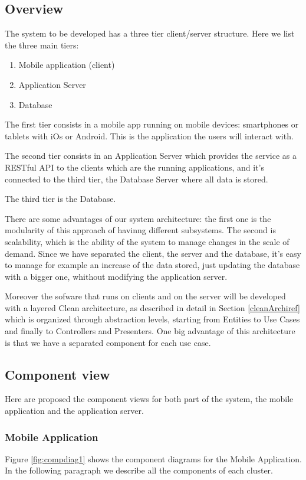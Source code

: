 \subsection{Overview}
The system to be developed has a three tier client/server structure.
Here we list the three main tiers:
\begin{enumerate}
  \item Mobile application (client)
  \item Application Server
  \item Database
\end{enumerate}

The first tier consists in a mobile app running on mobile devices: smartphones or tablets with iOs or Android.
This is the application the users will interact with.

The second tier consists in an Application Server which provides the service as a RESTful API to the clients which are the running applications, and it's connected to the third tier, the Database Server where all data is stored.

The third tier is the Database.

There are some advantages of our system architecture: the first one is the modularity of this approach of havinng different subsystems. The second is scalability,  which is the ability of the system to manage changes in the scale of demand. Since we have separated the client, the server and the database, it's easy to manage for example an increase of the data stored, just updating the database with a bigger one, whithout modifying the application server.

Moreover the sofware that runs on clients and on the server will be developed with a layered Clean architecture, as described in detail in Section \ref{cleanArchiref} which is organized through abstraction levels, starting from Entities to Use Cases and finally to Controllers and Presenters.
One big advantage of this architecture is that we have a separated component for each use case.

\subsection{Component view}
Here are proposed the component views for both part of the system, the mobile application and the application server.

\subsubsection{Mobile Application}
Figure \ref{fig:compdiag1} shows the component diagrams for the Mobile Application. In the following paragraph we describe all the components of each cluster.

